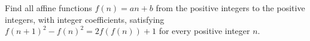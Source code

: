 Find all affine functions $f(n)=an+b$ from the positive integers to the positive integers, with integer coefficients, satisfying $f(n+1)^2-f(n)^2=2f(f(n))+1$ for every positive integer $n$.

